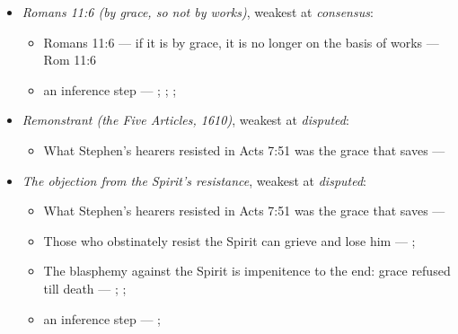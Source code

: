 \documentclass[11pt]{article}
\begin{document}
\begin{itemize}
\begin{itemize}
\item Grace is received by faith alone (encoded as a denial, so it ranks disputed) --- \cite[II-II q.4 a.3]{aquinas-summa-1920}; \cite[I-II q.113 a.4 ad 1]{aquinas-summa-1920}; \cite[Trent, Session VI (1547), canon 9]{tanner-decrees-1990}
\item an inference step --- \cite{pohle-molinism-1911}; \cite[I-II q.112 a.3]{aquinas-summa-1920}; \cite[ch. VII]{garrigou-lagrange-grace-1952}
\end{itemize}
\item \emph{Romans 11:6 (by grace, so not by works)}, weakest at \emph{consensus}:
\begin{itemize}
\item Romans 11:6 — if it is by grace, it is no longer on the basis of works --- Rom 11:6
\item an inference step --- \cite[Trent, Session VI (1547), ch. 8]{tanner-decrees-1990}; \cite[36]{waterworth-trent-1848}; \cite[Five Arminian Articles (1610), art. 4]{schaff-creeds-christendom-3-1977}; \cite[Canons of Dort, III/IV, art. 10]{schaff-creeds-christendom-3-1977}
\end{itemize}
\item \emph{Remonstrant (the Five Articles, 1610)}, weakest at \emph{disputed}:
\begin{itemize}
\item What Stephen’s hearers resisted in Acts 7:51 was the grace that saves --- \cite[Five Arminian Articles (1610), art. 4]{schaff-creeds-christendom-3-1977}
\end{itemize}
\item \emph{The objection from the Spirit’s resistance}, weakest at \emph{disputed}:
\begin{itemize}
\item What Stephen’s hearers resisted in Acts 7:51 was the grace that saves --- \cite[Five Arminian Articles (1610), art. 4]{schaff-creeds-christendom-3-1977}
\item Those who obstinately resist the Spirit can grieve and lose him --- \cite[Solid Declaration II.83]{concordia-triglotta-1921}; \cite[Solid Declaration XI.42]{concordia-triglotta-1921}
\item The blasphemy against the Spirit is impenitence to the end: grace refused till death --- \cite[325]{npnf1-06-1888}; \cite[II-II q.14 a.1]{aquinas-summa-1920}; \cite[74]{calvin-harmony-evangelists-2-1845}
\item an inference step --- \cite[325]{npnf1-06-1888}; \cite[On Rebuke and Grace, ch. 43]{npnf1-05-1887}

\end{itemize}
\end{itemize}
\end{document}
